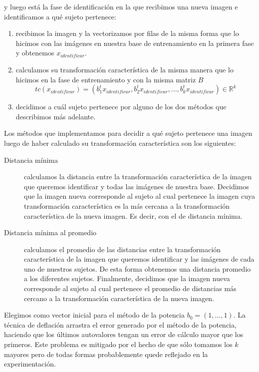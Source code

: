 y luego está la fase de identificación en la que recibimos una nueva imagen e identificamos a qué sujeto pertenece:
\begin{enumerate}
 \item recibimos la imagen y la vectorizamos por filas de la misma forma que lo hicimos con las imágenes en nuestra base de entrenamiento
 en la primera fase y obtenemos $x_{identificar}$.
 
 \item calculamos su transformación característica de la misma manera que lo hicimos en la fase de entrenamiento y con la misma matriz $B$
  \begin{displaymath}
			    tc(x_{identificar}) = ({b_1^t}x_{identificar}, {b_2^t}x_{identificar},..., {b_k^t}x_{identificar})\in\mathbb{R}^k
  \end{displaymath}
 
 \item decidimos a cuál sujeto pertenece por alguno de los dos métodos que describimos más adelante.

\end{enumerate}
Los métodos que implementamos para decidir a qué sujeto pertenece una imagen luego de haber calculado su transformación
característica son los siguientes:
\begin{description}
  \item[Distancia mínima] calculamos la distancia entre la transformación característica de la imagen que queremos identificar
  y todas las imágenes de nuestra base. Decidimos que la imagen nueva corresponde al sujeto al cual pertenece la imagen cuya transformación
  característica es la más cercana a la transformación característica de la nueva imagen. Es decir, con el de distancia mínima.
  \item[Distancia mínima al promedio] calculamos el promedio de las distancias entre la transformación característica de la imagen que 
  queremos identificar y las imágenes de cada uno de nuestros sujetos. De esta forma obtenemos una distancia promedio a los diferentes sujetos.
  Finalmente, decidimos que la imagen nueva corresponde al sujeto al cual pertenece el promedio de distancias más cercano 
  a la transformación característica de la nueva imagen.
\end{description}

Elegimos como vector inicial para el método de la potencia $b_0 = (1,...,1)$. La técnica de deflación arrastra el error generado por el método de la potencia, haciendo que los últimos autovalores tengan un error de cálculo 
mayor que los primeros. Este problema es mitigado por el hecho de que sólo tomamos los $k$ mayores pero de todas formas probablemente quede 
reflejado en la experimentación.

%




